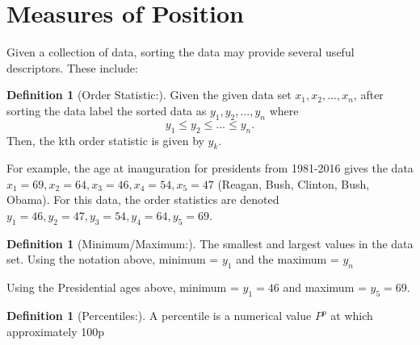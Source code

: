 \documentclass[10pt,]{book}
\theoremstyle{plain}
\theoremstyle{definition}
\newtheorem{definition}[theorem]{Definition}
\theoremstyle{definition}
\numberwithin{equation}{section}
\begin{document}
\section[Measures of Position]{Measures of Position}\label{section-6}
Given a collection of data, sorting the data may provide several useful descriptors. These include:
\begin{definition}[Order Statistic:]\label{definition-1}
Given the given data set \(x_1, x_2, ... , x_n\), after sorting the data label the sorted data as \(y_1, y_2, ..., y_n\) where  
	\begin{equation*} y_1 \le y_2 \le ... \le y_n.\end{equation*} 
	Then, the kth order statistic is given by \(y_k\). %
\end{definition}
\par

	For example, the age at inauguration for presidents from 1981-2016 gives the data \(x_1 = 69, x_2 = 64, x_3 = 46, x_4 = 54, x_5 = 47\) (Reagan, Bush, Clinton, Bush, Obama). For this data, the order statistics are denoted \(y_1 = 46, y_2 = 47, y_3 = 54, y_4 = 64, y_5 = 69\).
\begin{definition}[Minimum/Maximum:]\label{definition-2}
The smallest and largest values in the data set. Using the notation above, minimum = \(y_1\) and the maximum = \(y_n\)%
\end{definition}
\par

	Using the Presidential ages above, minimum = \(y_1 = 46\) and maximum = \(y_5 = 69\).
\begin{definition}[Percentiles:]\label{definition-3}
A percentile is a numerical value \(P^p\) at which approximately 100p%
\end{definition}
\par
\end{document}

